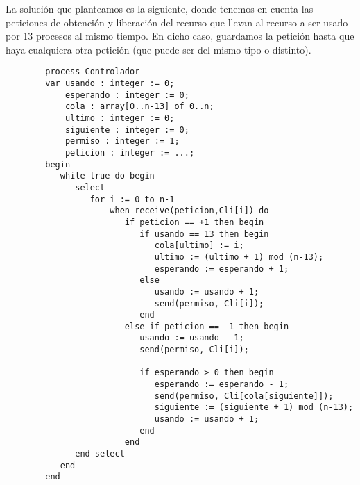 \begin{ejercicio}
    La solución que planteamos es la siguiente, donde tenemos en cuenta las peticiones de obtención y liberación del recurso que llevan al recurso a ser usado por 13 procesos al mismo tiempo. En dicho caso, guardamos la petición hasta que haya cualquiera otra petición (que puede ser del mismo tipo o distinto).
    \begin{verbatim}
        process Controlador
        var usando : integer := 0;
            esperando : integer := 0;
            cola : array[0..n-13] of 0..n;
            ultimo : integer := 0;
            siguiente : integer := 0;
            permiso : integer := 1;
            peticion : integer := ...;
        begin
           while true do begin
              select 
                 for i := 0 to n-1
                     when receive(peticion,Cli[i]) do
                        if peticion == +1 then begin
                           if usando == 13 then begin
                              cola[ultimo] := i;
                              ultimo := (ultimo + 1) mod (n-13);
                              esperando := esperando + 1;
                           else
                              usando := usando + 1;
                              send(permiso, Cli[i]);
                           end
                        else if peticion == -1 then begin
                           usando := usando - 1;
                           send(permiso, Cli[i]);

                           if esperando > 0 then begin
                              esperando := esperando - 1;
                              send(permiso, Cli[cola[siguiente]]);
                              siguiente := (siguiente + 1) mod (n-13);
                              usando := usando + 1;
                           end
                        end
              end select
           end
        end
    \end{verbatim}
\end{ejercicio}

